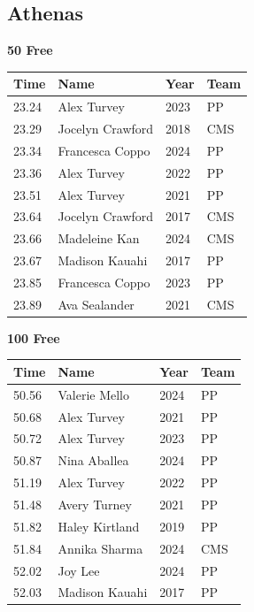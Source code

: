 \subsection{Athenas}
\vspace{1.2em}
\noindent\begin{minipage}[t]{0.98\textwidth}
\centering
\textbf{\textcolor{teamprimary}{50 Free}}\par
\vspace{0.5em}
\centering
\small
\renewcommand{\arraystretch}{1.0}
\setlength{\tabcolsep}{4pt}
\begin{tabular}{@{}p{2.5cm}p{4.5cm}p{1.5cm}p{2.5cm}@{}}
\toprule
\textbf{Time} & \textbf{Name} & \textbf{Year} & \textbf{Team} \\
\midrule
23.24 & Alex Turvey & 2023 & PP \\
23.29 & Jocelyn Crawford & 2018 & CMS \\
23.34 & Francesca Coppo & 2024 & PP \\
23.36 & Alex Turvey & 2022 & PP \\
23.51 & Alex Turvey & 2021 & PP \\
23.64 & Jocelyn Crawford & 2017 & CMS \\
23.66 & Madeleine Kan & 2024 & CMS \\
23.67 & Madison Kauahi & 2017 & PP \\
23.85 & Francesca Coppo & 2023 & PP \\
23.89 & Ava Sealander & 2021 & CMS \\
\bottomrule
\end{tabular}
\end{minipage}
\vspace{1.2em}
\noindent\begin{minipage}[t]{0.98\textwidth}
\centering
\textbf{\textcolor{teamprimary}{100 Free}}\par
\vspace{0.5em}
\centering
\small
\renewcommand{\arraystretch}{1.0}
\setlength{\tabcolsep}{4pt}
\begin{tabular}{@{}p{2.5cm}p{4.5cm}p{1.5cm}p{2.5cm}@{}}
\toprule
\textbf{Time} & \textbf{Name} & \textbf{Year} & \textbf{Team} \\
\midrule
50.56 & Valerie Mello & 2024 & PP \\
50.68 & Alex Turvey & 2021 & PP \\
50.72 & Alex Turvey & 2023 & PP \\
50.87 & Nina Aballea & 2024 & PP \\
51.19 & Alex Turvey & 2022 & PP \\
51.48 & Avery Turney & 2021 & PP \\
51.82 & Haley Kirtland & 2019 & PP \\
51.84 & Annika Sharma & 2024 & CMS \\
52.02 & Joy Lee & 2024 & PP \\
52.03 & Madison Kauahi & 2017 & PP \\
\bottomrule
\end{tabular}
\end{minipage}
